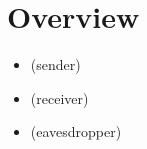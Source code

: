 \section{Overview}

\begin{frame}
\begin{itemize}
\item
  \alice{} (sender) \encryptex
\item
  \bob{} (receiver) \decryptex
\item
  \eve{} (eavesdropper) \eavesdropex
\end{itemize}
\end{frame}
